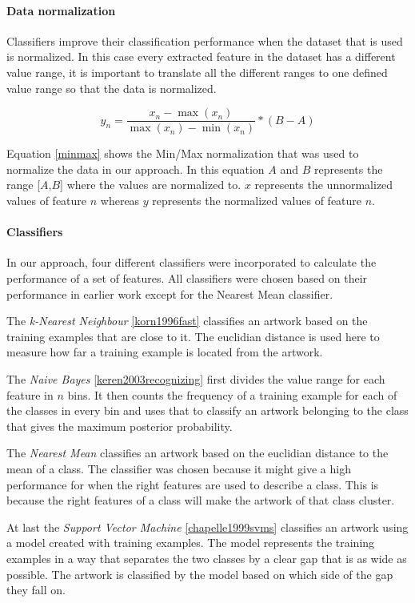 \paragraph{Data normalization}

Classifiers improve their classification performance when the dataset that is used is normalized.
In this case every extracted feature in the dataset has a different value range, it is important to translate all the different ranges to one defined value range so that the data is normalized.

\begin{equation}
\label{minmax}
y_n=\frac{x_n - \max(x_n)}{\max(x_n)-\min(x_n)} * (B-A)
\end{equation}

Equation \ref{minmax} shows the Min/Max normalization that was used to normalize the data in our approach.
In this equation $A$ and $B$ represents the range [$A$,$B$] where the values are normalized to.
$x$ represents the unnormalized values of feature $n$ whereas $y$ represents the normalized values of feature $n$.

\paragraph{Classifiers}
In our approach, four different classifiers were incorporated to calculate the performance of a set of features.
All classifiers were chosen based on their performance in earlier work except for the Nearest Mean classifier.

The \textit{k-Nearest Neighbour} \ref{korn1996fast} classifies an artwork based on the training examples that are close to it.
The euclidian distance is used here to measure how far a training example is located from the artwork.

The \textit{Naive Bayes} \ref{keren2003recognizing} first divides the value range for each feature in $n$ bins.
It then counts the frequency of a training example for each of the classes in every bin and uses that to classify an artwork belonging to the class that gives the maximum posterior probability.

The \textit{Nearest Mean} classifies an artwork based on the euclidian distance to the mean of a class.
The classifier was chosen because it might give a high performance for when the right features are used to describe a class.
This is because the right features of a class will make the artwork of that class cluster.

At last the \textit{Support Vector Machine} \ref{chapelle1999svms} classifies an artwork using a model created with training examples.
The model represents the training examples in a way that separates the two classes by a clear gap that is as wide as possible.
The artwork is classified by the model based on which side of the gap they fall on.

